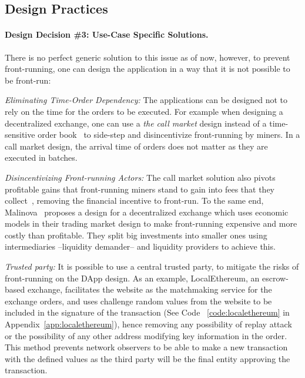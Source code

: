 
\subsection{Design Practices}

\paragraph{Design Decision \#3: Use-Case Specific Solutions.}
There is no perfect generic solution to this issue as of now, however, to prevent front-running, one can design the application in a way that it is not possible to be front-run:

\begin{compactlist}

\item \emph{Eliminating Time-Order Dependency:} The applications can be designed not to rely on the time for the orders to be executed. For example when designing a decentralized exchange, one can use a \emph{the call market} design instead of a time-sensitive order book~\cite{clark2014decentralizing} to side-step and disincentivize front-running by miners. In a call market design, the arrival time of orders does not matter as they are executed in batches. 

\item \emph{Disincentivizing Front-running Actors:} The call market solution also pivots profitable gains that front-running miners stand to gain into fees that they collect~\cite{clark2014decentralizing}, removing the financial incentive to front-run. To the same end, Malinova~\cite{malinova2017market} proposes a design for a decentralized exchange which uses economic models in their trading market design to make front-running expensive and more costly than profitable. They split big investments into smaller ones using intermediaries --liquidity demander-- and liquidity providers to achieve this.

\item \emph{Trusted party:} It is possible to use a central trusted party, to mitigate the risks of front-running on the DApp design. As an example, LocalEthereum, an escrow-based exchange, facilitates the website as the matchmaking service for the exchange orders, and uses challenge random values from the website to be included in the signature of the transaction (See Code ~\ref{code:localethereum} in Appendix~\ref{app:localethereum}), hence removing any possibility of replay attack or the possibility of any other address modifying key information in the order. This method prevents network observers to be able to make a new transaction with the defined values as the third party will be the final entity approving the transaction.
 \end{compactlist}

